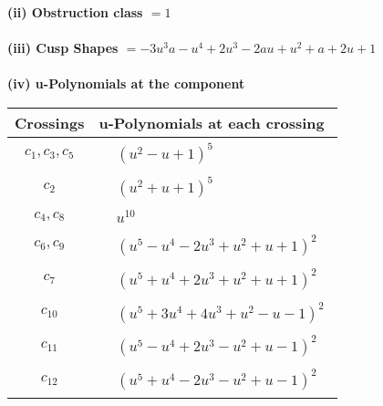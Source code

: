 \documentclass[1p]{elsarticle_modified}
\theoremstyle{definition}
\begin{document}
\flushleft \textbf{(ii) Obstruction class $= 1$}\\~\\
\flushleft \textbf{(iii) Cusp Shapes $= -3 u^3 a- u^4+2 u^3-2 a u+u^2+a+2 u+1$}\\~\\
\newpage\renewcommand{\arraystretch}{1}
\flushleft \textbf{(iv) u-Polynomials at the component}\newline \\
\begin{tabular}{m{50pt}|m{274pt}}
Crossings & \hspace{64pt}u-Polynomials at each crossing \\
\hline $$\begin{aligned}c_{1},c_{3},c_{5}\end{aligned}$$&$\begin{aligned}
&(u^2- u+1)^5
\end{aligned}$\\
\hline $$\begin{aligned}c_{2}\end{aligned}$$&$\begin{aligned}
&(u^2+u+1)^5
\end{aligned}$\\
\hline $$\begin{aligned}c_{4},c_{8}\end{aligned}$$&$\begin{aligned}
&u^{10}
\end{aligned}$\\
\hline $$\begin{aligned}c_{6},c_{9}\end{aligned}$$&$\begin{aligned}
&(u^5- u^4-2 u^3+u^2+u+1)^2
\end{aligned}$\\
\hline $$\begin{aligned}c_{7}\end{aligned}$$&$\begin{aligned}
&(u^5+u^4+2 u^3+u^2+u+1)^2
\end{aligned}$\\
\hline $$\begin{aligned}c_{10}\end{aligned}$$&$\begin{aligned}
&(u^5+3 u^4+4 u^3+u^2- u-1)^2
\end{aligned}$\\
\hline $$\begin{aligned}c_{11}\end{aligned}$$&$\begin{aligned}
&(u^5- u^4+2 u^3- u^2+u-1)^2
\end{aligned}$\\
\hline $$\begin{aligned}c_{12}\end{aligned}$$&$\begin{aligned}
&(u^5+u^4-2 u^3- u^2+u-1)^2
\end{aligned}$\\
\hline
\end{tabular}\\~\\
\end{document}
